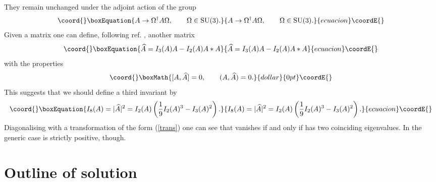 \documentclass[a4paper,12pt]{article}
\begin{document}
They remain unchanged under the adjoint action of the group
\begin{equation}\coord{}\boxEquation{
A \rightarrow \Omega^{\dagger} A \Omega, \qquad \Omega \in {\rm SU(3)}.
\label{trans}
}{
A \rightarrow \Omega^{\dagger} A \Omega, \qquad \Omega \in {\rm SU(3)}.
}{ecuacion}\coordE{}\end{equation}
Given a matrix \coordHE{} one can define, following ref. \cite{msw}, another matrix \coordHE{}
\begin{equation}\coord{}\boxEquation{ \label{hat}
\widehat{A} = I_3(A) A - I_2(A) A*A
}{ \widehat{A} = I_3(A) A - I_2(A) A*A
}{ecuacion}\coordE{}\end{equation}
with the properties
$$\coord{}\boxMath{[A,\widehat{A}] = 0, \qquad (A,\widehat{A}) = 0.}{dollar}{0pt}\coordE{}$$
This suggests that we should define a third invariant by
\begin{equation}\coord{}\boxEquation{ \label{inv+}
I_8(A) = |\widehat{A}|^2 = I_2(A) \left( \frac{1}{9} I_2(A)^3 - I_3(A)^2 \right).
}{ I_8(A) = |\widehat{A}|^2 = I_2(A) \left( \frac{1}{9} I_2(A)^3 - I_3(A)^2 \right).
}{ecuacion}\coordE{}\end{equation}
Diagonalising \coordHE{} with a transformation of the form (\ref{trans}) one can see
that \coordHE{} vanishes if and only if \coordHE{} has two coinciding eigenvalues. In the
generic case \coordHE{} is strictly positive, though.

\section{Outline of solution}
\end{document}

